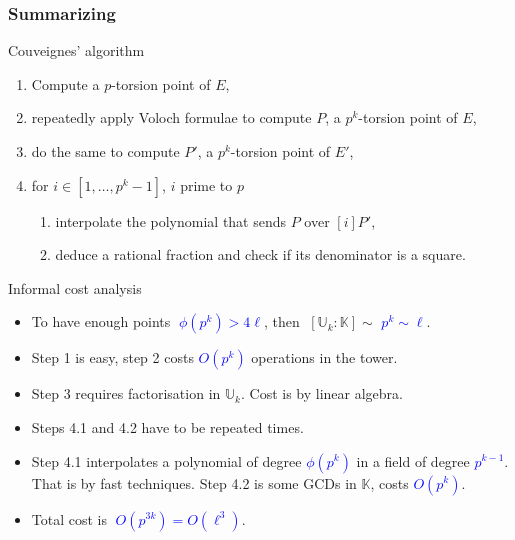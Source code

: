 \documentclass[10pt]{beamer}
\newcommand{\blue}[1]{\textcolor{blue}{#1}}  %
\newcommand{\K}{\mathbb{K}}  %
\newcommand{\U}{\mathbb{U}}  %
\newcommand{\euler}{\phi}  %
\newcommand{\0}{\mathcal{O}}  %
\begin{document}
\begin{frame}
  \frametitle{Summarizing}

  \vspace{-1mm}

  \begin{block}{Couveignes' algorithm}
    \begin{enumerate}
    \item Compute a $p$-torsion point of $E$,
    \item repeatedly apply Voloch formulae to compute $P$, a $p^k$-torsion
      point of $E$,
    \item do the same to compute $P'$, a $p^k$-torsion point of $E'$,
    \item for $i \in [1,\dots,p^k-1]$, $i$ prime to $p$
      \begin{enumerate}
      \item interpolate the polynomial that sends $P$ over $[i]P'$,
      \item deduce a rational fraction and check if its denominator is
        a square.
      \end{enumerate}
    \end{enumerate}
  \end{block}

  \vspace{-1mm}

  \begin{block}{Informal cost analysis}
    \begin{itemize}
    \item To have enough points \blue{$\;\euler(p^k) > 4\ell$}, then
      $\;[\U_k:\K] \sim$ \blue{$p^k \sim \ell$}.
    \item Step 1 is easy, step 2 costs \blue{$O(p^k)$}
      operations in the tower.
    \item Step 3 requires factorisation in $\U_k$. Cost is
      \alt<2>{\alert{$O(p^{3k})$}}{\blue{$O(p^{3k})$}} by linear
      algebra.
    \item Steps 4.1 and 4.2 have to be repeated
      \alt<2>{\alert{$\euler(p^k)$}}{\blue{$\euler(p^k)$}} times.
    \item Step 4.1 interpolates a polynomial of degree
      \blue{$\euler(p^k)$} in a field of degree \blue{$p^{k-1}$}. That
      is \alt<2>{\alert{$O(p^{2k})$}}{\blue{$O(p^{2k})$}} by fast
      techniques.  Step 4.2 is some GCDs in $\K$, costs
      \blue{$O(p^k)$}.
    \item<2> Total cost is \blue{$\;O(p^{3k}) = O(\ell^3)$}.
    \end{itemize}
  \end{block}
  
\end{frame}
\end{document}
